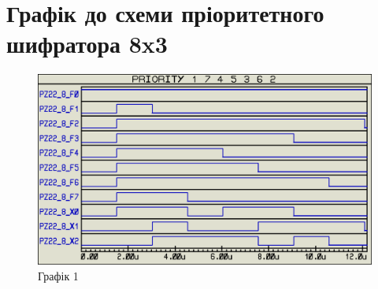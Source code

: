 \documentclass{article}
\begin{document}
\begin{normalsize}
\begin{figure}[H]
		\hspace{5px}
	\end{figure}

	\section*{Графік до схеми пріоритетного шифратора 8x3}
	\begin{figure}[H]
		\centering
		\includegraphics[scale=0.34]{g1}	
		\caption{Графік 1}
	\end{figure}


\end{normalsize}
\end{document}
